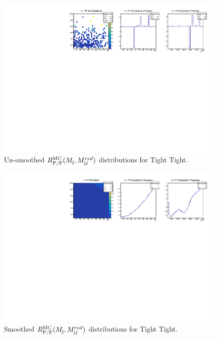 \begin{figure}[!htb]
	\centering
	\includegraphics[width=1\textwidth]{Figures/TT_nosmoothing.pdf}
	\caption{Un-smoothed $R^\mathrm{MC}_\mathrm{P/F}(M_{\textrm j},M_{\textrm jj}^{red})$ distributions for Tight Tight.}
	\label{fig:qcdunsmoothingTT}
\end{figure}
\begin{figure}[!htb]
	\centering
	\includegraphics[width=1\textwidth]{Figures/TT_smoothed.pdf}
	\caption{Smoothed $R^\mathrm{MC}_\mathrm{P/F}(M_{\textrm j},M_{\textrm jj}^{red})$ distributions for Tight Tight.}
	\label{fig:qcdsmoothingTT}
\end{figure}
